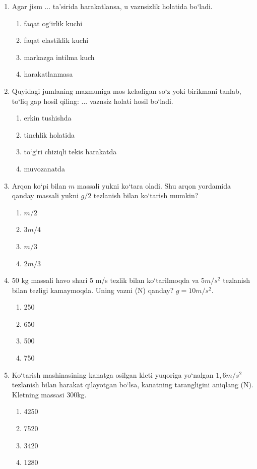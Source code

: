 \begin{enumerate}

\item Agar jism ... ta’sirida harakatlansa, u vaznsizlik holatida bo‘ladi.
\begin{enumerate}[label=\Alph*)]
\item faqat og‘irlik kuchi
\item faqat elastiklik kuchi
\item markazga intilma kuch
\item harakatlanmasa
\end{enumerate}

\item Quyidagi jumlaning mazmuniga mos keladigan so‘z yoki birikmani tanlab, to‘liq gap hosil qiling: ... vaznsiz holati hosil bo‘ladi.
\begin{enumerate}[label=\Alph*)]
\item erkin tushishda
\item tinchlik holatida
\item to‘g‘ri chiziqli tekis harakatda
\item muvozanatda
\end{enumerate}

\item Arqon ko‘pi bilan $m$ massali yukni ko‘tara oladi. Shu arqon yordamida qanday massali yukni $g/2$ tezlanish bilan ko‘tarish mumkin?
\begin{enumerate}[label=\Alph*)]
\item $m/2$
\item $3m/4$
\item $m/3$
\item $2m/3$
\end{enumerate}

\item 50 kg massali havo shari 5 m/s tezlik bilan ko‘tarilmoqda va $5 m/s^2$ tezlanish bilan tezligi kamaymoqda. Uning vazni (N) qanday? $g=10 m/s^2$.
\begin{enumerate}[label=\Alph*)]
\item 250
\item 650
\item 500
\item 750
\end{enumerate}

\item Ko‘tarish mashinasining kanatga osilgan kleti yuqoriga yo‘nalgan $1,6 m/s^2$ tezlanish bilan harakat qilayotgan bo‘lsa, kanatning tarangligini aniqlang (N). Kletning massasi 300kg.
\begin{enumerate}[label=\Alph*)]
\item 4250
\item 7520
\item 3420
\item 1280
\end{enumerate}


\end{enumerate}
